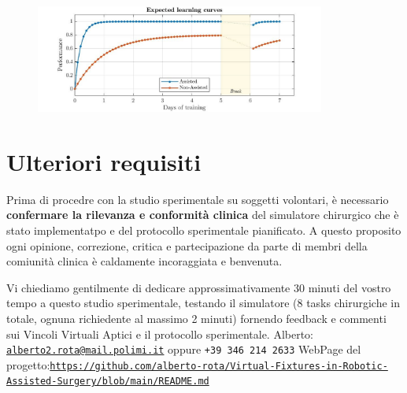 \documentclass{article}
\begin{document}
\begin{figure}[!h]
  \centering
  \includegraphics[width=0.85\textwidth]{expected.jpg}
  \end{figure} 
\section{Ulteriori requisiti}
Prima di procedre con la studio sperimentale su soggetti volontari, è necessario \textbf{confermare la rilevanza e conformità clinica} del simulatore chirurgico che è stato implementatpo e del protocollo sperimentale pianificato. A questo proposito ogni opinione, correzione, critica e partecipazione da parte di membri della comiunità clinica è caldamente incoraggiata e benvenuta.

\noindent 
Vi chiediamo gentilmente di dedicare approssimativamente 30 minuti del vostro tempo a questo studio sperimentale, testando il simulatore (8 tasks chirurgiche in totale, ognuna richiedente al massimo 2 minuti) fornendo feedback e commenti sui Vincoli Virtuali Aptici e il protocollo sperimentale. 
\newline \newline
{\footnotesize
Alberto: \texttt{\href{mailto:alberto2.rota@mail.polimi.it}{alberto2.rota@mail.polimi.it}} oppure \texttt{+39 346 214 2633}
\newline WebPage del progetto:\newline\noindent \href{https://github.com/alberto-rota/Virtual-Fixtures-in-Robotic-Assisted-Surgery/blob/main/README.md}{\texttt{https://github.com/alberto-rota/Virtual-Fixtures-in-Robotic-Assisted-Surgery/blob/main/README.md}
}}


\end{document}

